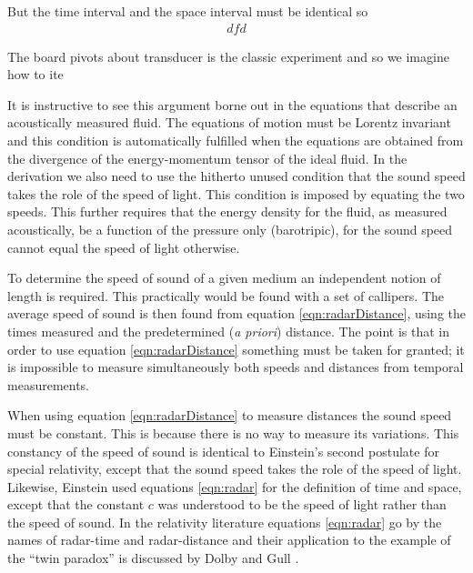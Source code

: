 \documentclass[10pt, fleqn,draft,showtrims,oldfontcommands]{article} %
\newcommand{\eqnref}[1]{\ref{eqn:#1}}
\begin{document}
But the time interval and the space interval must be identical
so
\begin{align}
  dfd
\end{align}


The board pivots about transducer is the classic experiment and so we imagine how to ite

It is instructive to see this argument borne out in the equations that describe an acoustically measured fluid.
The equations of motion must  be Lorentz invariant and this condition  is automatically fulfilled  when  the equations 
are obtained from the divergence of the energy-momentum tensor of the ideal fluid.
In the derivation we also need to use the hitherto unused  condition
that the sound speed takes the role  of the speed of light.
This condition is imposed by equating the two speeds.
This further requires that the energy density for the fluid, as measured acoustically, be a function of the pressure only (barotripic),
for the sound speed cannot equal the speed of light otherwise\cite{Taub1978}.




To determine the speed of sound of a given medium an independent notion of length is required.
This practically would be found with a set of callipers.
The average speed of sound is then found from equation \eqnref{radarDistance},
using the times measured and the predetermined ({\em a priori})  distance.
The point is that %
in order to use equation \eqnref{radarDistance} something must be taken for granted; 
it is impossible to measure simultaneously both speeds and distances from temporal measurements.


When using equation \eqnref{radarDistance} to measure distances the sound speed must be constant.
This is because there is no way to measure its variations.
This constancy of the speed of sound is identical to Einstein's  second postulate for special relativity\cite{Einstein1905},
except that the sound speed takes the role of the speed of light.
Likewise, Einstein used equations \eqnref{radar} for the definition of time and space, 
except that  the  constant $c$ was understood to be the speed of light rather than the speed of sound.
In the relativity literature equations \eqnref{radar} go by the names of radar-time 
and radar-distance and their application to the example of the ``twin paradox'' is discussed by Dolby and Gull  \cite{Dolby2001}.
\end{document}
